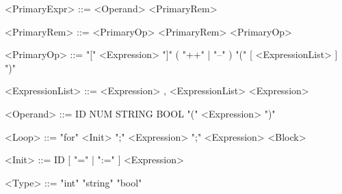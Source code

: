 \documentclass{article}
\begin{document}
\begin{grammar}
    <PrimaryExpr>       ::=     <Operand> <PrimaryRem>

    <PrimaryRem>        ::=     <PrimaryOp> <PrimaryRem> 
                        \alt    <PrimaryOp> 

    <PrimaryOp>         ::=     "[" <Expression> "]"
                        \alt    ( "++" | "--" ) 
                        \alt    "(" [ <ExpressionList> ] ")"

    <ExpressionList>    ::=     <Expression> , <ExpressionList> 
                        \alt    <Expression>

    <Operand>           ::=     ID 
                        \alt    NUM 
                        \alt    STRING 
                        \alt    BOOL 
                        \alt    "(" <Expression> ")" 



    <Loop>              ::=     "for" <Init> ";" <Expression> ";" <Expression> <Block>

    <Init>              ::=     ID [ "=" | ":=" ] <Expression>

    <Type>              ::=     "int"
                        \alt    "string"
                        \alt    "bool"

    \end{grammar}
\end{document}
